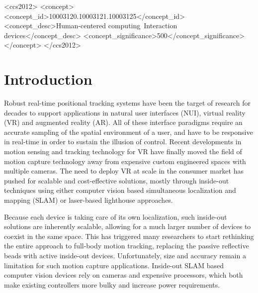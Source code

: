 \documentclass[sigchi]{acmart}
\begin{document}

\begin{CCSXML}
<ccs2012>
<concept>
<concept_id>10003120.10003121.10003125</concept_id>
<concept_desc>Human-centered computing~Interaction devices</concept_desc>
<concept_significance>500</concept_significance>
</concept>
</ccs2012>
\end{CCSXML}





\maketitle

\section{Introduction}
Robust real-time positional tracking systems have been the target of research for decades to support applications in natural user interfaces (NUI), virtual reality (VR) and augmented reality (AR). All of these interface paradigms require an accurate sampling of the spatial environment of a user, and have to be responsive in real-time in order to sustain the illusion of control. Recent developments in motion sensing and tracking technology for VR have finally moved the field of motion capture technology away from expensive custom engineered spaces with multiple cameras. The need to deploy VR at scale in the consumer market has pushed for scalable and cost-effective solutions, mostly through inside-out techniques using either computer vision based simultaneous localization and mapping (SLAM) or laser-based lighthouse approaches.

Because each device is taking care of its own localization, such inside-out solutions are inherently scalable, allowing for a much larger number of devices to coexist in the same space. This has triggered many researchers to start rethinking the entire approach to full-body motion tracking, replacing the passive reflective beads with active inside-out devices. Unfortunately, size and accuracy remain a limitation for such motion capture applications. Inside-out SLAM based computer vision devices rely on cameras and expensive processors, which both make existing controllers more bulky and increase power requirements.
\end{document}
